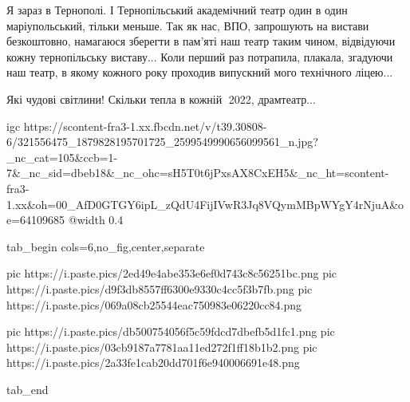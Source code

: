  
 
 
 
 


Я зараз в Тернополі. І Тернопільський академічний театр один в один
маріупольський, тільки меньше. Так як нас, ВПО, запрошують на вистави
безкоштовно, намагаюся зберегти в пам'яті наш театр таким чином, відвідуючи
кожну тернопільську виставу... Коли перший раз потрапила, плакала, згадуючи наш
театр, в якому кожного року проходив випускний мого технічного ліцею...


Які чудові світлини! Скільки тепла в кожній💖 2022, драмтеатр...

\ifcmt
  igc https://scontent-fra3-1.xx.fbcdn.net/v/t39.30808-6/321556475_1879828195701725_2599549990656099561_n.jpg?_nc_cat=105&ccb=1-7&_nc_sid=dbeb18&_nc_ohc=sH5T0t6jPxsAX8CxEH5&_nc_ht=scontent-fra3-1.xx&oh=00_AfD0GTGY6ipL_zQdU4FijIVwR3Jq8VQymMBpWYgY4rNjuA&oe=64109685
  @width 0.4
\fi

\begin{center}
\begin{minipage}{\textwidth}

\ifcmt
  tab_begin cols=6,no_fig,center,separate

     pic https://i.paste.pics/2ed49e4abe353e6ef0d743c8c56251bc.png
     pic https://i.paste.pics/d9f3db8557ff6300e9330c4cc5f3b7fb.png
     pic https://i.paste.pics/069a08cb25544eac750983e06220cc84.png

     pic https://i.paste.pics/db500754056f5c59fdcd7dbefb5d1fc1.png
     pic https://i.paste.pics/03cb9187a7781aa11ed272f1ff18b1b2.png
     pic https://i.paste.pics/2a33fe1cab20dd701f6e940006691e48.png

  tab_end
\fi

\end{minipage}
\end{center}

